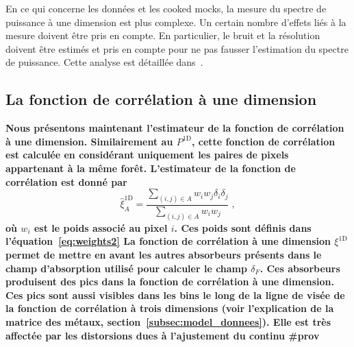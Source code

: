 \documentclass[11pt, twoside, a4paper, openright]{report}
\begin{document}
En ce qui concerne les données et les cooked mocks, la mesure du spectre de puissance à une dimension est plus complexe. Un certain nombre d'effets liés à la mesure doivent être pris en compte. En particulier, le bruit et la résolution doivent être estimés et pris en compte pour ne pas fausser l'estimation du spectre de puissance. Cette analyse est détaillée dans~\textcite{Chabanier2018}.

\subsection{La fonction de corrélation à une dimension}
\textbf{
  Nous présentons maintenant l'estimateur de la fonction de corrélation à une dimension. Similairement au $P^{\mathrm{1D}}$, cette fonction de corrélation est calculée en considérant uniquement les paires de pixels appartenant à la même forêt.
  L'estimateur de la fonction de corrélation est donné par
  \begin{equation}
\hat    \xi^{\mathrm{1D}}_A  = \frac{
      \sum\limits_{(i,j)\in A} w_i w_j \delta_i \delta_j
    }{
      \sum\limits_{(i,j)\in A} w_i w_j
    }
    \; ,
  \end{equation}
  où $w_i$ est le poids associé au pixel $i$. Ces poids sont définis dans l'équation~\ref{eq:weights2}
  La fonction de corrélation à une dimension $\xi^{\mathrm{1D}}$ permet de mettre en avant les autres absorbeurs présents dans le champ d'absorption utilisé pour calculer le champ $\delta_F$. Ces absorbeurs produisent des pics dans la fonction de corrélation à une dimension. Ces pics sont aussi visibles dans les bins le long de la ligne de visée de la fonction de corrélation à trois dimensions (voir l'explication de la matrice des métaux, section~\ref{subsec:model_donnees}). 
  Elle est très affectée par les distorsions dues à l'ajustement du continu \#prov
}
\end{document}
